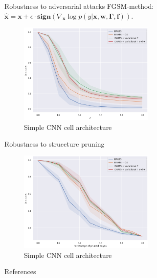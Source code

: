 \documentclass[usenames,dvipsnames,11pt,pdf,utf8,russian,aspectratio=169]{beamer}
\begin{document}
\begin{frame}{Robustness to adversarial attacks}
FGSM-method: $\hat{\mathbf{x}} = \mathbf{x} + \epsilon \cdot \textbf{sign}(\nabla_{\mathbf{x}} \log p(y|\mathbf{x}, \mathbf{w}, \boldsymbol{\Gamma}, \mathbf{f})).$

\begin{figure}[h]
\includegraphics[width=0.6\textwidth]{./var_fgm.png}
\caption*{Simple CNN cell architecture}
\end{figure}

\end{frame}


\begin{frame}{Robustness to struccture pruning}

\begin{figure}[h]
\includegraphics[width=0.6\textwidth]{./var_struct.png}
\caption*{Simple CNN cell architecture}
\end{figure}

\end{frame}


\begin{frame}{References}
\end{frame}
\end{document}
